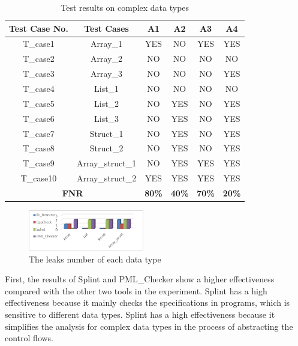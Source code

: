 \begin{table}[!h]
\center
\caption{Test results on complex data types}\label{tab:3}
\begin{tabular}{|c|c|c|c|c|c|}
\hline
\textbf{Test Case No.} & \textbf{Test Cases} & \textbf{A1} & \textbf{A2} & \textbf{A3} & \textbf{A4}\\
\hline
T\_case1	& Array\_1 &	YES & NO & YES & YES\\
\hline
T\_case2 & Array\_2 & NO & NO & NO & NO \\
\hline
T\_case3	& Array\_3 & NO &	NO & NO & YES\\
\hline
T\_case4	& List\_1	& NO &	NO & NO & NO\\
\hline
T\_case5	& List\_2 & NO & YES & NO & YES\\
\hline
T\_case6	& List\_3 &	NO	& YES & NO & YES\\
\hline
T\_case7	& Struct\_1 & NO & YES & NO & YES\\
\hline
T\_case8	& Struct\_2 & NO & YES & NO & YES\\
\hline
T\_case9	& Array\_struct\_1 & NO & YES & YES & YES\\
\hline
T\_case10 & Array\_struct\_2 & YES & YES & YES & YES\\
\hline
\multicolumn{2}{|c|}{\textbf{FNR}} & \textbf{80\%} & \textbf{40\%} & \textbf{70\%} & \textbf{20\%}\\
\hline
\end{tabular}
\end{table}

\begin{figure}[!h]
\includegraphics[width=0.45\textwidth]{figure/fig8-fig12/fig9}
\caption{The leaks number of each data type}
\label{fig:9}
\end{figure}


First, the results of Splint and PML\_Checker show a higher effectiveness compared with the other two tools in the experiment. Splint has a high effectiveness because it mainly checks the specifications in programs, which is sensitive to different data types. Splint has a high effectiveness because it simplifies the analysis for complex data types in the process of abstracting the control flows. 

